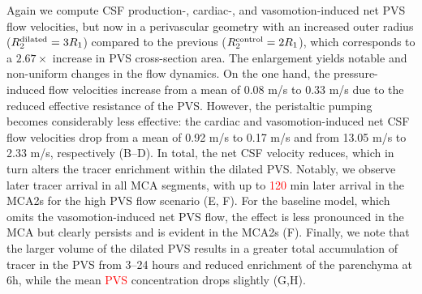\documentclass[fleqn,10pt]{wlscirep}
\newcommand{\discuss}[1]{\textcolor{red}{#1}}
\begin{document}
Again we compute CSF production-, cardiac-, and vasomotion-induced net PVS flow velocities, but now in a perivascular geometry with an increased outer radius ($R^{\rm dilated}_2 = 3 R_1$) compared to the previous ($R^{\rm control}_2 = 2 R_1$), which corresponds to a $2.67 \times$ increase in PVS cross-section area.
The enlargement yields notable and non-uniform changes in the flow
dynamics. On the one hand, the pressure-induced flow velocities
increase from a mean of 0.08 \textmu m/s to 0.33 \textmu m/s due to
the reduced effective resistance of the PVS. However, the peristaltic
pumping becomes considerably less effective: the cardiac and
vasomotion-induced net CSF flow velocities drop from a mean of 0.92
\textmu m/s to 0.17 \textmu m/s and from 13.05 \textmu m/s to 2.33
\textmu m/s, respectively (B--D). In total, the
net CSF velocity reduces, which in turn alters the tracer enrichment
within the dilated PVS. Notably, we observe later tracer arrival in
all MCA segments, with up to \discuss{120} min later arrival in the
MCA2s for the high PVS flow scenario (E, F). For
the baseline model, which omits the vasomotion-induced net PVS flow,
the effect is less pronounced in the MCA but clearly persists and is
evident in the MCA2s (F). Finally, we note that
the larger volume of the dilated PVS results in a greater total
accumulation of tracer in the PVS from 3--24 hours and reduced
enrichment of the parenchyma at 6h, while the mean \discuss{PVS}
concentration drops slightly (G,H).
\end{document}
